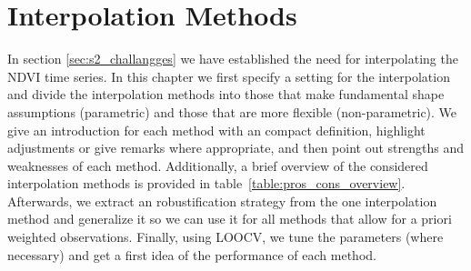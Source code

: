 \newcommand{\RobItPlot}{fitted to different (SCL45) NDVI time series. Iterations of a robustifing refit (as indicated in section~\ref{sec:loess_robustify}) are also displayed}


\chapter{Interpolation Methods} \label{sec:itpl}
	{%
		In section \ref{sec:s2_challangges} we have established the need for interpolating the NDVI time series. In this chapter we first specify a setting for the interpolation and divide the interpolation methods into those that make fundamental shape assumptions (parametric) and those that are more flexible (non-parametric). We give an introduction for each method with an compact definition, highlight adjustments or give remarks where appropriate, and then point out strengths and weaknesses of each method. Additionally, a brief overview of the considered interpolation methods is provided in table~\ref{table:pros_cons_overview}.
		Afterwards, we extract an robustification strategy from the one interpolation method and generalize it so we can use it for all methods that allow for a priori weighted observations. Finally, using LOOCV, we tune the parameters (where necessary) and get a first idea of the performance of each method.


	}
	{%
		\footnotesize
		
		\normalsize
	}



